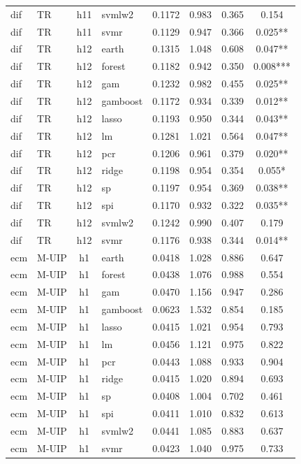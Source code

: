 \begin{ThreePartTable}
\begin{longtable}[t]{llclcccc}
dif & TR & h11 & svmlw2 & 0.1172 & 0.983 & 0.365 & 0.154\\
dif & TR & h11 & svmr & 0.1129 & 0.947 & 0.366 & 0.025**\\
\addlinespace
dif & TR & h12 & earth & 0.1315 & 1.048 & 0.608 & 0.047**\\
dif & TR & h12 & forest & 0.1182 & 0.942 & 0.350 & 0.008***\\
dif & TR & h12 & gam & 0.1232 & 0.982 & 0.455 & 0.025**\\
dif & TR & h12 & gamboost & 0.1172 & 0.934 & 0.339 & 0.012**\\
dif & TR & h12 & lasso & 0.1193 & 0.950 & 0.344 & 0.043**\\
dif & TR & h12 & lm & 0.1281 & 1.021 & 0.564 & 0.047**\\
dif & TR & h12 & pcr & 0.1206 & 0.961 & 0.379 & 0.020**\\
dif & TR & h12 & ridge & 0.1198 & 0.954 & 0.354 & 0.055*\\
dif & TR & h12 & sp & 0.1197 & 0.954 & 0.369 & 0.038**\\
dif & TR & h12 & spi & 0.1170 & 0.932 & 0.322 & 0.035**\\
dif & TR & h12 & svmlw2 & 0.1242 & 0.990 & 0.407 & 0.179\\
dif & TR & h12 & svmr & 0.1176 & 0.938 & 0.344 & 0.014**\\
\addlinespace
ecm & M-UIP & h1 & earth & 0.0418 & 1.028 & 0.886 & 0.647\\
ecm & M-UIP & h1 & forest & 0.0438 & 1.076 & 0.988 & 0.554\\
ecm & M-UIP & h1 & gam & 0.0470 & 1.156 & 0.947 & 0.286\\
ecm & M-UIP & h1 & gamboost & 0.0623 & 1.532 & 0.854 & 0.185\\
ecm & M-UIP & h1 & lasso & 0.0415 & 1.021 & 0.954 & 0.793\\
ecm & M-UIP & h1 & lm & 0.0456 & 1.121 & 0.975 & 0.822\\
ecm & M-UIP & h1 & pcr & 0.0443 & 1.088 & 0.933 & 0.904\\
ecm & M-UIP & h1 & ridge & 0.0415 & 1.020 & 0.894 & 0.693\\
ecm & M-UIP & h1 & sp & 0.0408 & 1.004 & 0.702 & 0.461\\
ecm & M-UIP & h1 & spi & 0.0411 & 1.010 & 0.832 & 0.613\\
ecm & M-UIP & h1 & svmlw2 & 0.0441 & 1.085 & 0.883 & 0.637\\
ecm & M-UIP & h1 & svmr & 0.0423 & 1.040 & 0.975 & 0.733\\

\end{longtable}
\end{ThreePartTable}
